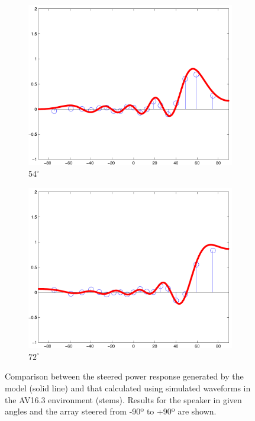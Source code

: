 \documentclass[spanish,openright]{book}
\begin{document}
\begin{figure}
\begin{subfigure}[b]{0.3\textwidth}
    \includegraphics[width=\textwidth]{Sim_seg025_ang144}
    \caption{$54^{\circ}$}
    \label{fig:Sim_ang144}
  \end{subfigure}


  \begin{subfigure}[b]{0.3\textwidth}
    \includegraphics[width=\textwidth]{Sim_seg025_ang162}
    \caption{$72^{\circ}$}
    \label{fig:Sim_ang162}
  \end{subfigure}

  \caption{Comparison between the steered power response generated
    by the model (solid line) and that calculated using simulated
    waveforms in the AV16.3 environment (stems). Results for the
    speaker in given angles and the array steered from -90º to
    +90º are shown.}
  \label{fig:Sim_angles}
\end{figure}
\end{document}
